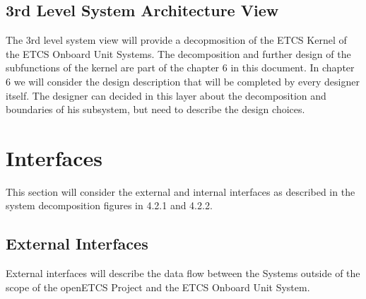 \subsection{3rd Level System Architecture View}
The 3rd level system view will provide a decopmosition of the ETCS Kernel of the ETCS Onboard Unit Systems. The decomposition and further design of the subfunctions of the kernel are part of the chapter 6 in this document. In chapter 6 we will consider the design description that will be completed by every designer itself. The designer can decided in this layer about the decomposition and boundaries of his subsystem, but need to describe the design choices.


\section{Interfaces}
This section will consider the external and internal interfaces as described in the system decomposition figures in 4.2.1 and 4.2.2.

\subsection{External Interfaces}
External interfaces will describe the data flow between the Systems outside of the scope of the openETCS Project and the ETCS Onboard Unit System.

